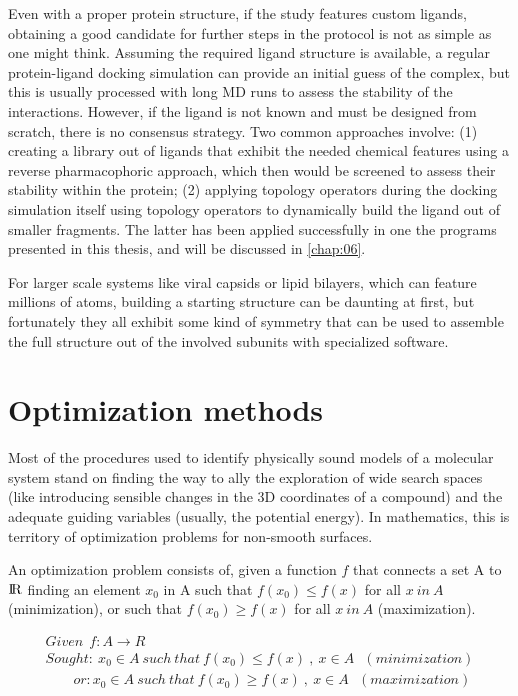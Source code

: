 Even with a proper protein structure, if the study features custom ligands, obtaining a good candidate for further steps in the protocol is not as simple as one might think. Assuming the required ligand structure is available, a regular protein-ligand docking simulation can provide an initial guess of the complex, but this is usually processed with long MD runs to assess the stability of the interactions. However, if the ligand is not known and must be designed from scratch, there is no consensus strategy. Two common approaches involve: (1) creating a library out of ligands that exhibit the needed chemical features using a reverse pharmacophoric approach, which then would be screened to assess their stability within the protein; (2) applying topology operators during the docking simulation itself using topology operators to dynamically build the ligand out of smaller fragments. The latter has been applied successfully in one the programs presented in this thesis, and will be discussed in \autoref{chap:06}.

For larger scale systems like viral capsids or lipid bilayers, which can feature millions of atoms, building a starting structure can be daunting at first, but fortunately they all exhibit some kind of symmetry that can be used to assemble the full structure out of the involved subunits with specialized software.\cite{bietz2016siena,sym}

\section{Optimization methods}

Most of the procedures used to identify physically sound models of a molecular system stand on finding the way to ally the exploration of wide search spaces (like introducing sensible changes in the 3D coordinates of a compound) and the adequate guiding variables (usually, the potential energy). In mathematics, this is territory of optimization problems for non-smooth surfaces.

An optimization problem consists of, given a function $ f $ that connects a set A to ${\rm I\!R}$ finding an element $ x_{0} $ in A such that $ f(x_{0}) \leq f(x) $ for all $ x~in~A $  (minimization), or such that $ f(x_{0}) \geq f(x) $ for all $ x~in~A $ (maximization).

\begin{align}
	Given ~~ f:A \rightarrow R \nonumber \\
	Sought: ~ x_{0} \in A ~ such ~ that ~ f(x_{0})  \leq f(x) ~,~x \in A ~~~ ( minimization ) \nonumber \\
	~~~~~~~~~ or: x_{0} \in A ~ such ~ that ~ f(x_{0})  \geq f(x) ~,~x \in A ~~~ ( maximization )
\end{align}

